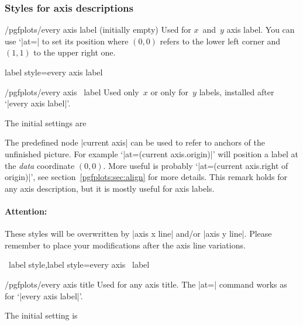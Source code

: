 \subsubsection*{Styles for axis descriptions}

\begin{stylekey}{/pgfplots/every axis label (initially empty)}
 Used for $x$~and~$y$ axis label. You can use `|at=| to set its position where $(0,0)$ refers to the lower left corner and $(1,1)$ to the upper right one.
\end{stylekey}

\pgfplotsshortstylekey label style=every axis label\pgfeov

\begin{xystylekey}{/pgfplots/every axis \x\ label}
 Used only~$x$ or only for~$y$ labels, installed after `|every axis label|'.

 The initial settings are
\begin{codeexample}
\end{codeexample}

 The predefined node |current axis| can be used to refer to anchors of the unfinished picture. For example
 `|at={(current axis.origin)}|' will position a label at the \emph{data} coordinate $(0,0)$. More useful is probably
 `|at={(current axis.right of origin)}|', see
 section~\ref{pgfplots:sec:align} for more details. This remark holds
 for any axis description, but it is mostly useful for axis labels.

\paragraph{Attention:} These styles will be overwritten by |axis x line| and/or |axis y line|. Please remember to place your modifications after the axis line variations.
\end{xystylekey}

\pgfplotsshortxystylekeys \x\ label style,\x label style=every axis \x\ label\pgfeov

\begin{stylekey}{/pgfplots/every axis title}
 Used for any axis title. The |at=| command works as for `|every axis label|'.

The initial setting is
\begin{codeexample}
\end{codeexample}
\end{stylekey}

